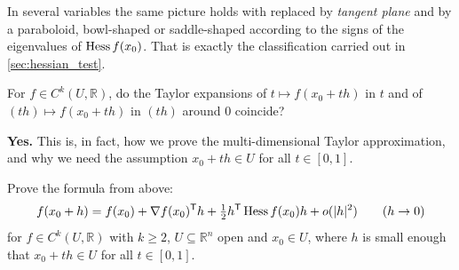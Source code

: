 In several variables the same picture holds with  replaced by \emph{tangent
plane} and  by a paraboloid, bowl-shaped or saddle-shaped according to the
signs of the eigenvalues of $\operatorname{Hess} f(x_0)$. That is exactly the classification carried out in
\cref{sec:hessian_test}.

\begin{question}
For $f \in C^k(U, \mathbb{R})$, do the Taylor expansions of $t \mapsto f(x_0+th)$ in $t$ and of
$(th) \mapsto f(x_0+th)$ in $(th)$ around $0$ coincide?
\end{question}

\begin{answer}
\textbf{Yes.} This is, in fact, how we prove the multi-dimensional Taylor approximation, and why
we need the assumption $x_0 + th \in U$ for all $t \in [0,1]$.
\end{answer}

\begin{exercise}
\label{ex:hessian_taylor_proof}
Prove the formula from above:
\[f(x_0+h) = f(x_0) + \nabla f(x_0)^{\mathsf{T}} h + \tfrac{1}{2}h^{\mathsf{T}} \operatorname{Hess} f(x_0)h + o(|h|^2)
  \qquad (h \to 0)\]
for $f \in C^k(U,\mathbb{R})$ with $k \geq 2$, $U \subseteq \mathbb{R}^n$ open and $x_0 \in U$,
where $h$ is small enough that $x_0 + th \in U$ for all $t \in [0,1]$.
\end{exercise}

